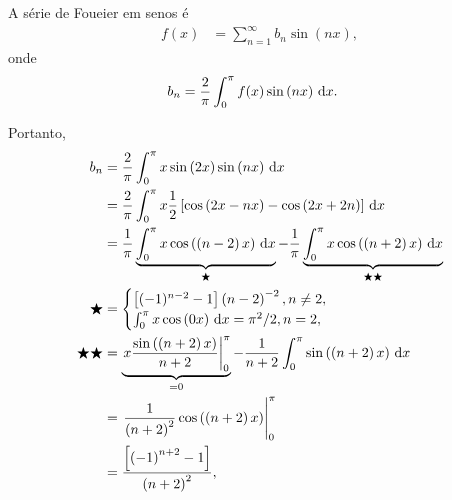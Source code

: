 \documentclass[a4paper,12pt, leqno, answers]{exam}
\begin{document}
\begin{questions}
\begin{center}
  \end{center}
  \begin{solution}
    A série de Foueier em senos é
    \begin{align*}
      f(x) &= \sum_{n = 1}^\infty b_n \sin\left( n x \right),
    \end{align*}
    onde
    \begin{align*}
      b_n &= \frac{2}{\pi} \int_0^\pi f(x) \sin\left( n x \right) \, \mathrm{d}x.
    \end{align*}

    Portanto,
    \begin{align*}
      b_n &= \frac{2}{\pi} \int_0^\pi x \sin\left( 2 x \right) \sin\left( n x \right) \, \mathrm{d}x \\
      &= \frac{2}{\pi} \int_0^\pi x \frac{1}{2} \left[ \cos\left( 2 x - n x \right) - \cos\left( 2 x + 2 n \right) \right] \, \mathrm{d}x \\
      &= \frac{1}{\pi} \underbrace{\int_0^\pi x \cos\left( \left( n - 2 \right) x \right) \, \mathrm{d}x}_{\bigstar} - \frac{1}{\pi} \underbrace{\int_0^\pi x \cos\left( \left( n + 2 \right) x \right) \, \mathrm{d}x}_{\bigstar\bigstar} \\
      \bigstar &= \begin{cases}
        \left[ (-1)^{n - 2} - 1 \right] \left( n - 2 \right)^{-2}, n \neq 2, \\
        \int_0^\pi x \cos\left( 0 x \right) \, \mathrm{d}x = \pi^2 / 2, n = 2,
      \end{cases} \\
      \bigstar\bigstar &= \underbrace{\left. x \frac{\sin\left( \left( n + 2 \right) x \right)}{n + 2} \right|_0^\pi}_{=0} - \frac{1}{n + 2} \int_0^\pi \sin\left( \left( n + 2 \right) x \right) \, \mathrm{d}x \\
      &= \left. \frac{1}{\left( n + 2 \right)^2} \cos\left( \left( n + 2 \right) x \right) \right|_0^\pi \\
      &= \frac{\left[ \left( -1 \right)^{n + 2} - 1 \right]}{\left( n + 2 \right)^2},
    \end{align*}


\end{solution}
\end{questions}
\end{document}
